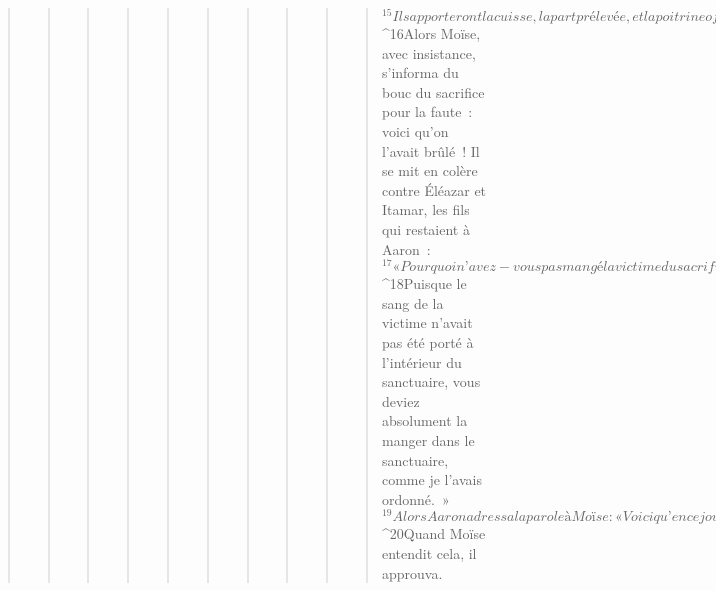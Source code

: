 \begin{verse}
\begin{verse}
\begin{verse}
\begin{verse}
\begin{verse}
\begin{verse}
\begin{verse}
\begin{verse}
\begin{verse}
\begin{verse}
${}^{15}Ils apporteront la cuisse, la part prélevée, et la poitrine offerte avec le geste d’élévation, ainsi que les graisses, en nourriture offerte. Elles seront offertes avec le geste d’élévation devant le Seigneur. C’est un décret perpétuel édicté par le Seigneur pour toi et pour tes fils après toi, comme le Seigneur l’a ordonné. »
${}^{16}Alors Moïse, avec insistance, s’informa du bouc du sacrifice pour la faute : voici qu’on l’avait brûlé ! Il se mit en colère contre Éléazar et Itamar, les fils qui restaient à Aaron : 
${}^{17}« Pourquoi n’avez-vous pas mangé la victime du sacrifice pour la faute dans le Lieu saint ? C’est une part très sainte qui vous a été accordée pour ôter le péché de la communauté et pour que soit accompli sur celle-ci le rite d’expiation, devant le Seigneur. 
${}^{18}Puisque le sang de la victime n’avait pas été porté à l’intérieur du sanctuaire, vous deviez absolument la manger dans le sanctuaire, comme je l’avais ordonné. » 
${}^{19}Alors Aaron adressa la parole à Moïse : « Voici qu’en ce jour ils ont présenté leur sacrifice pour la faute et leur holocauste devant le Seigneur. Mais après ce qui m’est arrivé, le Seigneur approuverait-il que je mange d’un sacrifice pour la faute en un tel jour ? » 
${}^{20}Quand Moïse entendit cela, il approuva.
      

\end{verse}
\end{verse}
\end{verse}
\end{verse}
\end{verse}
\end{verse}
\end{verse}
\end{verse}
\end{verse}
\end{verse}
